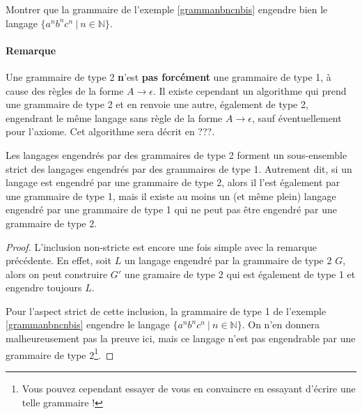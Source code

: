 \begin{exercice}
Montrer que la grammaire de l'exemple \ref{grammanbncnbis} engendre bien le langage \newline $\{a^nb^nc^n ~|~ n \in \mathbb{N}\}$.
\end{exercice}

\paragraph{Remarque} Une grammaire de type 2 \textbf{n}'est \textbf{pas forcément} une grammaire de type 1, à cause des règles de la forme $A \rightarrow \epsilon$. Il existe cependant un algorithme qui prend une grammaire de type 2 et en renvoie une autre, également de type 2, engendrant le même langage sans règle de la forme $A \rightarrow \epsilon$, sauf éventuellement pour l'axiome. Cet algorithme sera décrit en ???. %


\begin{lemma}
Les langages engendrés par des grammaires de type 2 forment un sous-ensemble strict des langages engendrés par des grammaires de type 1. Autrement dit, si un langage est engendré par une grammaire de type 2, alors il l'est également par une grammaire de type 1, mais il existe au moins un (et même plein) langage engendré par une grammaire de type 1 qui ne peut pas être engendré par une grammaire de type 2.  
\end{lemma}

\begin{proof}
L'inclusion non-stricte est encore une fois simple avec la remarque précédente. En effet, soit $L$ un langage engendré par la grammaire de type 2 $G$, alors on peut construire $G'$ une gramaire de type 2 qui est également de type 1 et engendre toujours $L$.

Pour l'aspect strict de cette inclusion, la grammaire de type 1 de l'exemple \ref{grammanbncnbis} engendre le langage $\{a^nb^nc^n ~|~ n \in \mathbb{N}\}$. On n'en donnera malheureusement pas la preuve ici, mais ce langage n'est pas engendrable par une grammaire de type 2\footnote{Vous pouvez cependant essayer de vous en convaincre en essayant d'écrire une telle grammaire !}.
\end{proof}